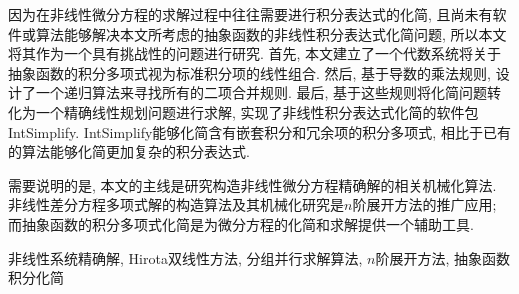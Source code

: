 因为在非线性微分方程的求解过程中往往需要进行积分表达式的化简, 且尚未有软件或算法能够解决本文所考虑的抽象函数的非线性积分表达式化简问题, 所以本文将其作为一个具有挑战性的问题进行研究. 首先, 本文建立了一个代数系统将关于抽象函数的积分多项式视为标准积分项的线性组合. 然后, 基于导数的乘法规则, 设计了一个递归算法来寻找所有的二项合并规则. 最后, 基于这些规则将化简问题转化为一个精确线性规划问题进行求解, 实现了非线性积分表达式化简的软件包 IntSimplify.  IntSimplify能够化简含有嵌套积分和冗余项的积分多项式, 相比于已有的算法能够化简更加复杂的积分表达式. 

需要说明的是, 本文的主线是研究构造非线性微分方程精确解的相关机械化算法. 非线性差分方程多项式解的构造算法及其机械化研究是$n$阶展开方法的推广应用; 而抽象函数的积分多项式化简是为微分方程的化简和求解提供一个辅助工具.

\bigskip
{}
非线性系统精确解, Hirota双线性方法, 分组并行求解算法, $n$阶展开方法, 抽象函数积分化简
